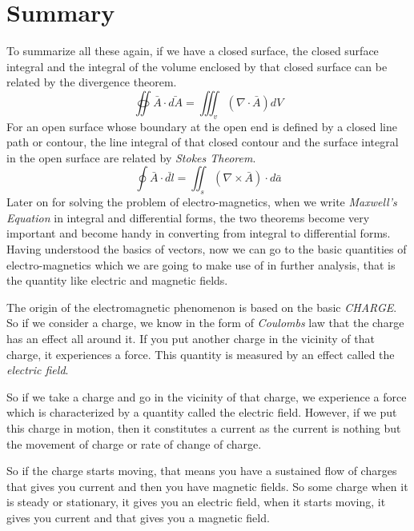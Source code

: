\section{Summary}
To summarize all these again, if we have a closed surface, the closed surface integral and the integral of the volume enclosed by that closed surface can be related by the divergence theorem.
\begin{equation}
\oiint \bar{A}\cdot\bar{dA} = \iiint_v(\nabla\cdot\bar{A})dV
\end{equation}
For an open surface whose boundary at the open end is defined by a closed line path or contour, the line integral of that closed contour and the surface integral in the open surface are related by \emph{Stokes Theorem}.
\begin{equation}
\oint\bar{A}\cdot\bar{dl} = \iint_s(\nabla\times\bar{A})\cdot d\bar{a}
\end{equation}	
Later on for solving the problem of electro-magnetics, when we write \emph{Maxwell's Equation} in integral and differential forms, the two theorems become very important and become handy in converting from integral to differential forms. Having understood the basics of vectors, now we can go to the basic quantities of electro-magnetics which we are going to make use of in further analysis, that is the quantity like electric and magnetic fields.

The origin of the electromagnetic phenomenon is based on the basic \emph{CHARGE}. So if we consider a charge, we know in the form of \emph{Coulombs} law that the charge has an effect all around it. If you put another charge in the vicinity of that charge, it experiences a force. This quantity is measured by an effect called the \emph{electric field}.

So if we take a charge and go in the vicinity of that charge, we experience a force which is characterized by a quantity called the electric field. However, if we put this charge in motion, then it constitutes a current as the current is nothing but the movement of charge or rate of change of charge.

So if the charge starts moving, that means you have a sustained flow of charges that gives you current and then you have magnetic fields. So some charge when it is steady or stationary, it gives you an electric field, when it starts moving, it gives you current and that gives you a magnetic field.

